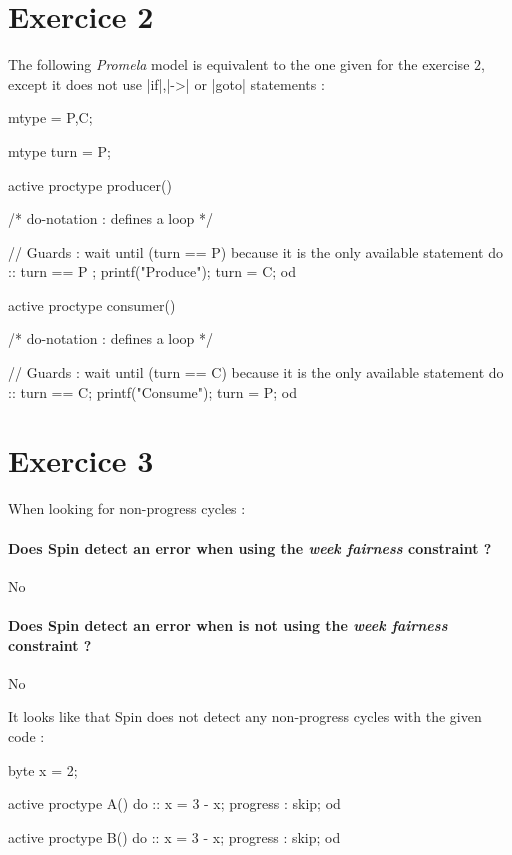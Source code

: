 \documentclass[a4paper,11pt]{report}
\begin{document}
\section*{Exercice 2}

The following \textit{Promela} model is equivalent to the one given for the
exercise $2$, except it does not use \promelainline|if|,\promelainline|->| or
\promelainline|goto| statements :

\begin{listing}[H]
\centering
\begin{promelacode}
mtype = {P,C};

mtype turn = P;

active proctype producer() {
    /* do-notation : defines a loop */

    // Guards : wait until (turn == P) because it is the only available statement
    do :: turn == P ;
        printf("Produce\n");
        turn = C;
    od
}

active proctype consumer() {
    /* do-notation : defines a loop */

    // Guards : wait until (turn == C) because it is the only available statement
    do :: turn == C;
        printf("Consume\n");
        turn = P;
    od
}
\end{promelacode}
\end{listing}



\section*{Exercice 3}

When looking for non-progress cycles :

\paragraph*{Does Spin detect an error when using the \textit{week fairness}
  constraint ?} No

\paragraph*{Does Spin detect an error when is not using the \textit{week
    fairness} constraint ?} No

It looks like that Spin does not detect any non-progress cycles with the given
code :

\begin{listing}[H]
\centering
\begin{promelacode}
byte x = 2;

active proctype A(){
    do :: x = 3 - x; progress : skip; od
}

active proctype B(){
    do :: x = 3 - x; progress : skip; od
}
\end{promelacode}
\end{listing}
\end{document}
